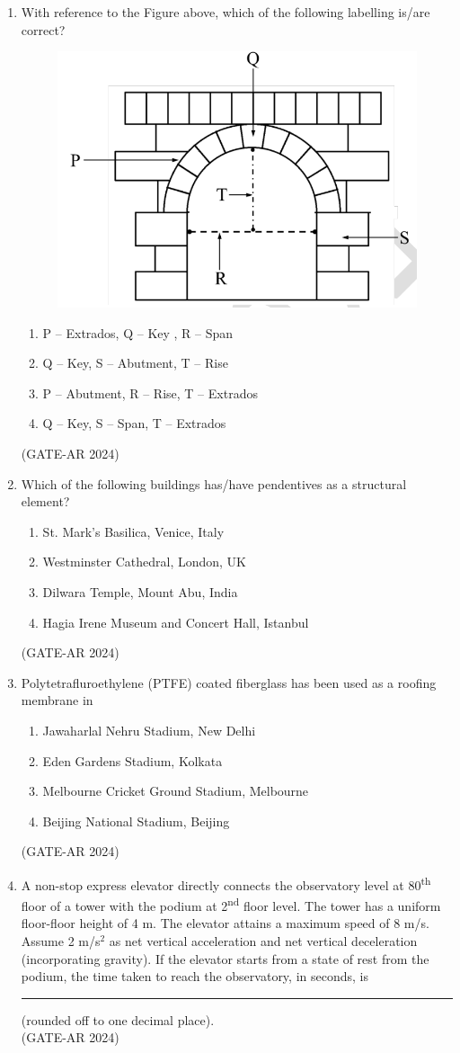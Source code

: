 \documentclass[a4paper,10pt]{article}
\begin{document}
\begin{enumerate}
    \item With reference to the Figure above, which of the following labelling is/are correct?
    \begin{figure}[h!]
    \centering
    \includegraphics[width=0.3\columnwidth]{figs/13.jpg}
    \caption{}
    \label{fig:Img13}
    \end{figure}
    \begin{enumerate}
        \item P – Extrados, Q – Key , R – Span
        \item Q – Key, S – Abutment, T – Rise
        \item P – Abutment, R – Rise, T – Extrados
        \item Q – Key, S – Span, T – Extrados
    \end{enumerate}
    \hfill (GATE-AR 2024)

    \item Which of the following buildings has/have pendentives as a structural element?
    \begin{enumerate}
        \item St. Mark's Basilica, Venice, Italy
        \item Westminster Cathedral, London, UK
        \item Dilwara Temple, Mount Abu, India
        \item Hagia Irene Museum and Concert Hall, Istanbul
    \end{enumerate}
    \hfill (GATE-AR 2024)

    \item Polytetrafluroethylene (PTFE) coated fiberglass has been used as a roofing membrane in
    \begin{enumerate}
        \item Jawaharlal Nehru Stadium, New Delhi
        \item Eden Gardens Stadium, Kolkata
        \item Melbourne Cricket Ground Stadium, Melbourne
        \item Beijing National Stadium, Beijing
    \end{enumerate}
    \hfill (GATE-AR 2024)

    \item A non-stop express elevator directly connects the observatory level at 80\textsuperscript{th} floor of a tower with the podium at 2\textsuperscript{nd} floor level. The tower has a uniform floor-floor height of 4 m. The elevator attains a maximum speed of 8 m/s. Assume 2 m/s$^2$ as net vertical acceleration and net vertical deceleration (incorporating gravity). If the elevator starts from a state of rest from the podium, the time taken to reach the observatory, in seconds, is \rule{2cm}{0.4pt} (rounded off to one decimal place). \\
    \hfill (GATE-AR 2024)


\end{enumerate}
\end{document}
